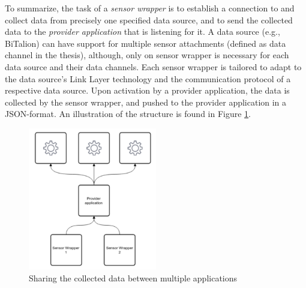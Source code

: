 To summarize, the task of a \textit{sensor wrapper} is to establish a connection to and collect data from precisely one specified data source, and to send the collected data to the \textit{provider application} that is listening for it. A data source (e.g., BiTalion) can have support for multiple sensor attachments (defined as data channel in the thesis), although, only on sensor wrapper is necessary for each data source and their data channels. Each sensor wrapper is tailored to adapt to the data source's Link Layer technology and the communication protocol of a respective data source. Upon activation by a provider application, the data is collected by the sensor wrapper, and pushed to the provider application in a JSON-format. An illustration of the structure is found in Figure \ref{fig:provider_SW}.

\begin{figure}
    \centering
    \includegraphics[width=0.5\textwidth]{images/provider_SW.png}
    \caption{Sharing the collected data between multiple applications \cite{gjoby}}
    \label{fig:provider_SW}
\end{figure}